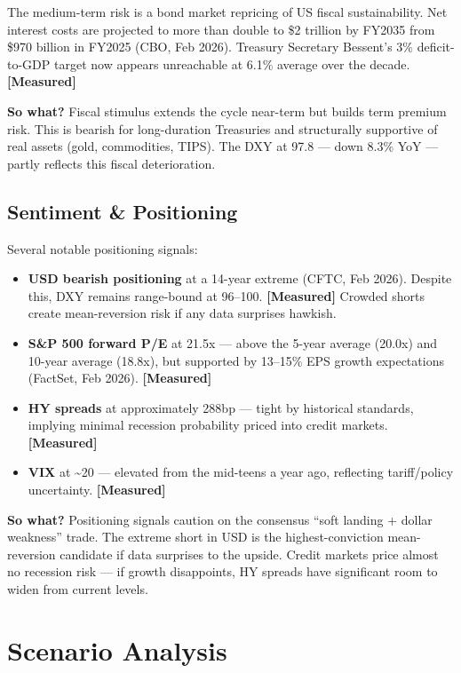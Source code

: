 \documentclass{wilson-report}
\begin{document}
The medium-term risk is a bond market repricing of US fiscal sustainability. Net interest costs are projected to more than double to \$2 trillion by FY2035 from \$970 billion in FY2025 (CBO, Feb 2026). Treasury Secretary Bessent's 3\% deficit-to-GDP target now appears unreachable at 6.1\% average over the decade. \textbf{[Measured]}

\textbf{So what?} Fiscal stimulus extends the cycle near-term but builds term premium risk. This is bearish for long-duration Treasuries and structurally supportive of real assets (gold, commodities, TIPS). The DXY at 97.8 --- down 8.3\% YoY --- partly reflects this fiscal deterioration.

\subsection{Sentiment \& Positioning}

Several notable positioning signals:

\begin{itemize}[leftmargin=1.2em, itemsep=2pt]
  \item \textbf{USD bearish positioning} at a 14-year extreme (CFTC, Feb 2026). Despite this, DXY remains range-bound at 96--100. \textbf{[Measured]} Crowded shorts create mean-reversion risk if any data surprises hawkish.
  \item \textbf{S\&P 500 forward P/E} at 21.5x --- above the 5-year average (20.0x) and 10-year average (18.8x), but supported by 13--15\% EPS growth expectations (FactSet, Feb 2026). \textbf{[Measured]}
  \item \textbf{HY spreads} at approximately 288bp --- tight by historical standards, implying minimal recession probability priced into credit markets. \textbf{[Measured]}
  \item \textbf{VIX} at \textasciitilde20 --- elevated from the mid-teens a year ago, reflecting tariff/policy uncertainty. \textbf{[Measured]}
\end{itemize}

\textbf{So what?} Positioning signals caution on the consensus ``soft landing + dollar weakness'' trade. The extreme short in USD is the highest-conviction mean-reversion candidate if data surprises to the upside. Credit markets price almost no recession risk --- if growth disappoints, HY spreads have significant room to widen from current levels.

\section{Scenario Analysis}
\end{document}
